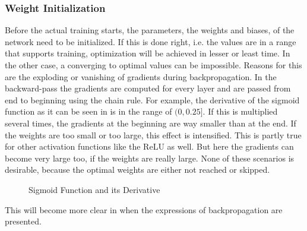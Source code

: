 \subsubsection{Weight Initialization}
\label{sec:training-weight-initialization}
Before the actual training starts, the parameters, the weights and biases, of the network need to be initialized.
If this is done right, i.e. the values are in a range that supports training, optimization will be achieved in lesser or least time.
In the other case, a converging to optimal values can be impossible.
Reasons for this are the exploding or vanishing of gradients during backpropagation\cite{Hochreiter1991}.
In the backward-pass the gradients are computed for every layer and are passed from end to beginning using the chain rule.
For example, the derivative of the sigmoid function as it can be seen in  is in the range of $(0, 0.25]$.
If this is multiplied several times, the gradients at the beginning are way smaller than at the end.
If the weights are too small or too large, this effect is intensified.
This is partly true for other activation functions like the ReLU as well.
But here the gradients can become very large too, if the weights are really large.
None of these scenarios is desirable, because the optimal weights are either not reached or skipped.
\begin{figure}
	\setlength{}
	\setlength{}
	\centering
	
	\caption{Sigmoid Function and its Derivative}
	\label{fig:sigmoid-derivative}
\end{figure}
This will become more clear in  when the expressions of backpropagation are presented.

